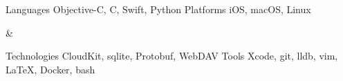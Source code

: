 

\begin{cvskills}
\begin{cvskillgroup}
\cvskill
	{Languages}
	{Objective-C, C, Swift, Python}
\cvskill
	{Platforms}
	{iOS, macOS, Linux}
\end{cvskillgroup} &
\begin{cvskillgroup}
\cvskill
	{Technologies}
	{CloudKit, sqlite, Protobuf, WebDAV}
\cvskill
	{Tools}
	{Xcode, git, lldb, vim, \LaTeX{}, Docker, bash}
\end{cvskillgroup}
\end{cvskills}
